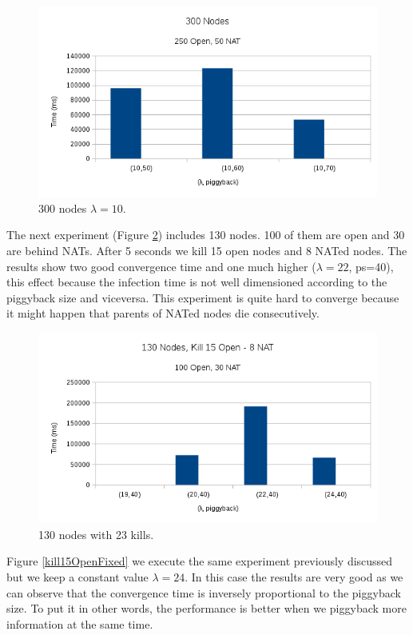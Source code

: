\documentclass[10pt,a4paper]{proc}
\begin{document}
\begin{figure}
\centering
\includegraphics[scale=0.5]{metrics/allAliveFixedLamda.png}
\caption{300 nodes $\lambda=10$.}
\label{allAliveFixedLamda}
\end{figure}

The next experiment (Figure \ref{kill15Open}) includes 130 nodes. 100 of them are open and 30 are behind NATs. After 5 seconds we kill 15 open nodes and 8 NATed nodes. The results show two good convergence time and one much higher ($\lambda=22$, ps=40), this effect because the infection time is not well dimensioned according to the piggyback size and viceversa. This experiment is quite hard to converge because it might happen that parents of NATed nodes die consecutively.

\begin{figure}
\centering
\includegraphics[scale=0.5]{metrics/kill15Open.png}
\caption{130 nodes with 23 kills.}
\label{kill15Open}
\end{figure}

Figure \ref{kill15OpenFixed} we execute the same experiment previously discussed but we keep a constant value $\lambda=24$. In this case the results are very good as we can observe that the convergence time is inversely proportional to the piggyback size. To put it in other words, the performance is better when we piggyback more information at the same time.
\end{document}
